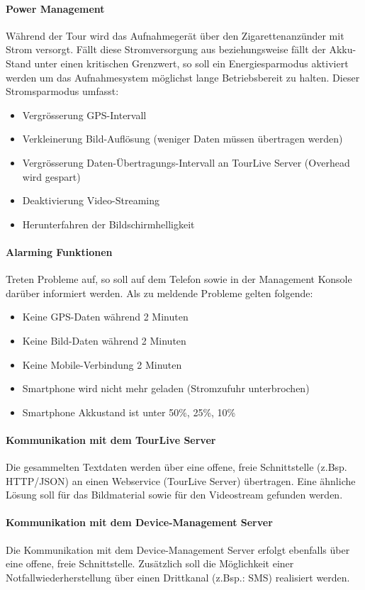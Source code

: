 \paragraph{Power Management}
Während der Tour wird das Aufnahmegerät über den Zigarettenanzünder mit Strom versorgt. Fällt diese Stromversorgung aus beziehungsweise fällt der Akku-Stand unter einen kritischen Grenzwert, so soll ein Energiesparmodus aktiviert werden um das Aufnahmesystem möglichst lange Betriebsbereit zu halten. Dieser Stromsparmodus umfasst:
\begin{itemize}
\item Vergrösserung GPS-Intervall
\item Verkleinerung Bild-Auflösung (weniger Daten müssen übertragen werden)
\item Vergrösserung Daten-Übertragungs-Intervall an TourLive Server (Overhead wird gespart)
\item Deaktivierung Video-Streaming
\item Herunterfahren der Bildschirmhelligkeit
\end{itemize}

\paragraph{Alarming Funktionen}
Treten Probleme auf, so soll auf dem Telefon sowie in der Management Konsole darüber informiert werden. Als zu meldende Probleme gelten folgende:
\begin{itemize}
\item Keine GPS-Daten während 2 Minuten
\item Keine Bild-Daten während 2 Minuten
\item Keine Mobile-Verbindung 2 Minuten
\item Smartphone wird nicht mehr geladen (Stromzufuhr unterbrochen)
\item Smartphone Akkustand ist unter 50\%, 25\%, 10\%
\end{itemize}

	
\paragraph{Kommunikation mit dem TourLive Server}
Die gesammelten Textdaten werden über eine offene, freie Schnittstelle (z.Bsp. HTTP/JSON) an einen Webservice (TourLive Server) übertragen. Eine ähnliche Lösung soll für das Bildmaterial sowie für den Videostream gefunden werden.

\paragraph{Kommunikation mit dem Device-Management Server}
Die Kommunikation mit dem Device-Management Server erfolgt ebenfalls über eine offene, freie Schnittstelle. Zusätzlich soll die Möglichkeit einer Notfallwiederherstellung über einen Drittkanal (z.Bsp.: SMS) realisiert werden.

